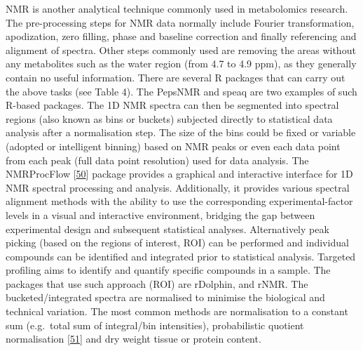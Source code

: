 \documentclass[]{article}
\begin{document}
NMR is another analytical technique commonly used in metabolomics research. The pre-processing steps for NMR data normally include Fourier transformation, apodization, zero filling, phase and baseline correction and finally referencing and alignment of spectra. Other steps commonly used are removing the areas without any metabolites such as the water region (from 4.7 to 4.9 ppm), as they generally contain no useful information. There are several R packages that can carry out the above tasks (see Table 4). The PepsNMR and speaq are two examples of such R-based packages. The 1D NMR spectra can then be segmented into spectral regions (also known as bins or buckets) subjected directly to statistical data analysis after a normalisation step. The size of the bins could be fixed or variable (adopted or intelligent binning) based on NMR peaks or even each data point from each peak (full data point resolution) used for data analysis. The NMRProcFlow {[}\protect\hyperlink{ref-jacob_2017}{50}{]} package provides a graphical and interactive interface for 1D NMR spectral processing and analysis. Additionally, it provides various spectral alignment methods with the ability to use the corresponding experimental-factor levels in a visual and interactive environment, bridging the gap between experimental design and subsequent statistical analyses. Alternatively peak picking (based on the regions of interest, ROI) can be performed and individual compounds can be identified and integrated prior to statistical analysis. Targeted profiling aims to identify and quantify specific compounds in a sample. The packages that use such approach (ROI) are rDolphin, and rNMR. The bucketed/integrated spectra are normalised to minimise the biological and technical variation. The most common methods are normalisation to a constant sum (e.g.~total sum of integral/bin intensities), probabilistic quotient normalisation {[}\protect\hyperlink{ref-dieterle_2006}{51}{]} and dry weight tissue or protein content.
\end{document}
